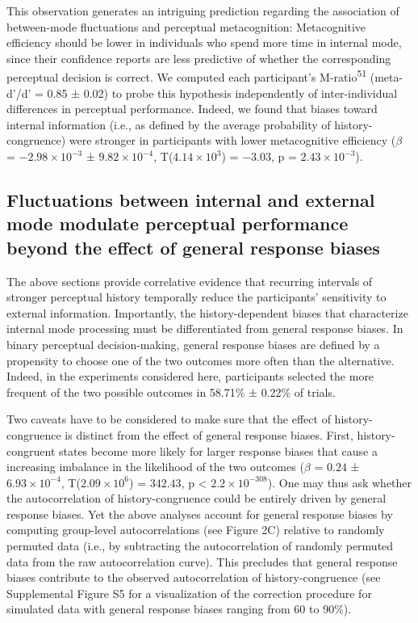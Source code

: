 \documentclass[
]{article}
\begin{document}
This observation generates an intriguing prediction regarding the
association of between-mode fluctuations and perceptual metacognition:
Metacognitive efficiency should be lower in individuals who spend more
time in internal mode, since their confidence reports are less
predictive of whether the corresponding perceptual decision is correct.
We computed each participant's M-ratio\textsuperscript{51} (meta-d'/d' =
0.85 ± 0.02) to probe this hypothesis independently of inter-individual
differences in perceptual performance. Indeed, we found that biases
toward internal information (i.e., as defined by the average probability
of history-congruence) were stronger in participants with lower
metacognitive efficiency (\(\beta\) =
\(\ensuremath{-2.98\times 10^{-3}}\) ±
\(\ensuremath{9.82\times 10^{-4}}\),
T(\(\ensuremath{4.14\times 10^{3}}\)) = \(-3.03\), p =
\(\ensuremath{2.43\times 10^{-3}}\)).

\hypertarget{fluctuations-between-internal-and-external-mode-modulate-perceptual-performance-beyond-the-effect-of-general-response-biases}{%
\subsection{Fluctuations between internal and external mode modulate
perceptual performance beyond the effect of general response
biases}\label{fluctuations-between-internal-and-external-mode-modulate-perceptual-performance-beyond-the-effect-of-general-response-biases}}

The above sections provide correlative evidence that recurring intervals
of stronger perceptual history temporally reduce the participants'
sensitivity to external information. Importantly, the history-dependent
biases that characterize internal mode processing must be differentiated
from general response biases. In binary perceptual decision-making,
general response biases are defined by a propensity to choose one of the
two outcomes more often than the alternative. Indeed, in the experiments
considered here, participants selected the more frequent of the two
possible outcomes in 58.71\% ± 0.22\% of trials.

Two caveats have to be considered to make sure that the effect of
history-congruence is distinct from the effect of general response
biases. First, history-congruent states become more likely for larger
response biases that cause a increasing imbalance in the likelihood of
the two outcomes (\(\beta\) = \(0.24\) ±
\(\ensuremath{6.93\times 10^{-4}}\),
T(\(\ensuremath{2.09\times 10^{6}}\)) = \(342.43\), p < \(\ensuremath{2.2\times 10^{-308}}\)). One may
thus ask whether the autocorrelation of history-congruence could be
entirely driven by general response biases. Yet the above analyses
account for general response biases by computing group-level
autocorrelations (see Figure 2C) relative to randomly permuted data
(i.e., by subtracting the autocorrelation of randomly permuted data from
the raw autocorrelation curve). This precludes that general response
biases contribute to the observed autocorrelation of history-congruence
(see Supplemental Figure S5 for a visualization of the correction
procedure for simulated data with general response biases ranging from
60 to 90\%).
\end{document}
